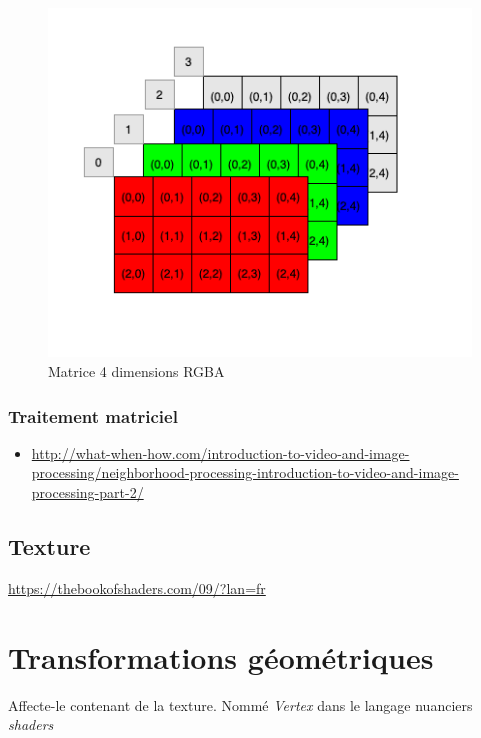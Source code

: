 \documentclass[
  french,
]{book}
\providecommand{\tightlist}{%
  \setlength{\itemsep}{0pt}\setlength{\parskip}{0pt}}
\begin{document}
\begin{figure}
\centering
\includegraphics{medias/traiter/figures/dia_matrice_RGBA.png}
\caption{Matrice 4 dimensions RGBA}
\end{figure}

\hypertarget{traitement-matriciel}{%
\subsubsection{Traitement matriciel}\label{traitement-matriciel}}

\begin{itemize}
\tightlist
\item
  \url{http://what-when-how.com/introduction-to-video-and-image-processing/neighborhood-processing-introduction-to-video-and-image-processing-part-2/}
\end{itemize}

\hypertarget{texture}{%
\subsection{Texture}\label{texture}}

\url{https://thebookofshaders.com/09/?lan=fr}

\hypertarget{transformations-guxe9omuxe9triques}{%
\section{Transformations géométriques}\label{transformations-guxe9omuxe9triques}}

Affecte-le contenant de la texture. Nommé \emph{Vertex} dans le langage nuanciers \emph{shaders}
\end{document}
